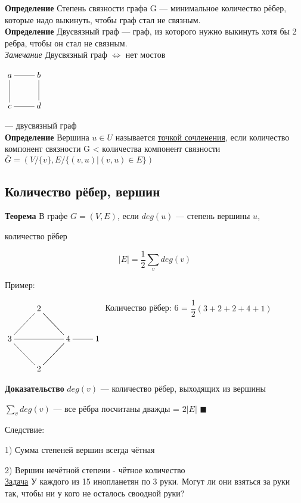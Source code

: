 \documentclass[a4paper, 12pt] {article}
\begin{document}
\textbf{Определение}
Степень связности графа G --- минимальное количество рёбер, которые надо выкинуть, чтобы граф стал не связным.\\
\textbf{Определение}
Двусвязный граф --- граф, из которого нужно выкинуть хотя бы 2 ребра, чтобы он стал не связным.\\
\textit{Замечание} Двусвязный граф $ \Leftrightarrow $ нет мостов

$\xymatrix{
	a \ar@{-}[d] \ar@{-}[r] & b \ar@{-}[d] \\
	c  \ar@{-}[r] & d \\
}$

--- двусвязный граф\\

\textbf{Определение}
Вершина $ u  \in U $ называется \underline{точкой сочленения},  если количество компонент связности G < количества компонент связности $ \bar G = (V / \{v\}, E / \{(v, u) | (v, u) \in E\}) $\\
\subsection{Количество рёбер, вершин}

\textbf{Теорема}
В графе $G = (V, E)$, если $deg(u)$ --- степень вершины $ u $,

 количество рёбер 


\begin{equation*}
	|E| = \dfrac{1}{2} \sum_v deg(v)
\end{equation*}

Пример:

$\xymatrix{
	& 2 \ar@{-}[dl] \ar@{-}[dr] \\
	3 \ar@{-}[rr] & &  4 \ar@{-}[ul] \ar@{-}[dl] & 1 \ar@{-}[l]\\
	& 2 \ar@{-}[ul] \ar@{-}[ur]\\
}$
Количество рёбер: 6 = $ \dfrac{1}{2} (3+2+2+4+1)$

\textbf{Доказательство}
$deg(v)$ --- количество рёбер, выходящих из вершины

$ \sum_v deg(v) $ --- все рёбра посчитаны дважды = $ 2|E| $ $ \blacksquare $

Следствие:

1) Сумма степеней вершин всегда чётная

2) Вершин нечётной степени - чётное количество\\

\underline{Задача}
У каждого из 15 инопланетян по 3 руки. Могут ли они взяться за руки так, чтобы ни у кого не осталось своодной руки?
\end{document}
